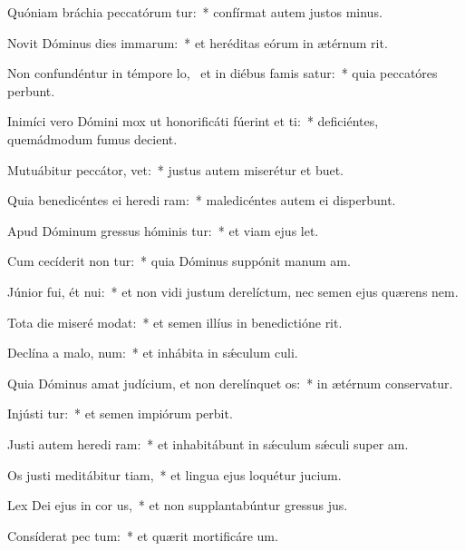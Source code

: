 \item Quóniam bráchia peccatórum tur:~* confírmat autem justos minus.
\item Novit Dóminus dies immarum:~* et heréditas eórum in ætérnum rit.
\item Non confundéntur in témpore lo,~\pscross{} et in diébus famis satur:~* quia peccatóres perbunt.
\item Inimíci vero Dómini mox ut honorificáti fúerint et ti:~* deficiéntes, quemádmodum fumus decient.
\item Mutuábitur peccátor,   vet:~* justus autem miserétur et buet.
\item Quia benedicéntes ei heredi ram:~* maledicéntes autem ei disperbunt.
\item Apud Dóminum gressus hóminis tur:~* et viam ejus let.
\item Cum cecíderit non tur:~* quia Dóminus suppónit manum am.
\item Júnior fui, ét nui:~* et non vidi justum derelíctum, nec semen ejus quærens nem.
\item Tota die miseré  modat:~* et semen illíus in benedictióne rit.
\item Declína a malo,   num:~* et inhábita in sǽculum culi.
\item Quia Dóminus amat judícium, et non derelínquet  os:~* in ætérnum conservatur.
\item Injústi tur:~* et semen impiórum perbit.
\item Justi autem heredi ram:~* et inhabitábunt in sǽculum sǽculi super am.
\item Os justi meditábitur tiam,~* et lingua ejus loquétur jucium.
\item Lex Dei ejus in cor us,~* et non supplantabúntur gressus jus.
\item Consíderat pec tum:~* et quærit mortificáre um.
